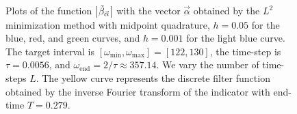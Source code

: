 \documentclass[a4paper,11pt,bibliography=totoc,listof=totoc,headinclude=true,cleardoublepage=empty,oneside]{scrbook}
\newcommand{\dffv}{\Tilde{\beta}_{\Vec{\alpha}}}
\newcommand{\e}{\mathrm{end}}
\begin{document}
\begin{figure}[h]
    \caption{Plots of the function $\left|\dffv\right|$ with the vector $\Vec{\alpha}$ obtained by the $L^2$ minimization method with midpoint quadrature, $h=0.05$ for the blue, red, and green curves, and $h=0.001$ for the light blue curve. The target interval is $\left[\omega_{\min}, \omega_{\max} \right] = [122, 130]$, the time-step is $\tau = 0.0056$, and $\omega_\e = 2/\tau \approx 357.14$. We vary the number of time-steps $L$. The yellow curve represents the discrete filter function obtained by the inverse Fourier transform of the indicator with end-time $T = 0.279$.}
    \label{fig:l2 ex2}
\end{figure}

\end{document}
